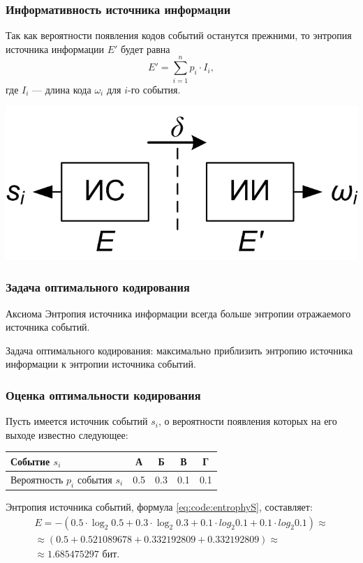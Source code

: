 \begin{frame}
    \frametitle{Информативность источника \alert{информации}}
    
    Так как вероятности появления кодов событий останутся прежними, то энтропия \alert{источника информации} $E'$ будет равна
    \begin{equation}
        \label{eq:code:entrophyI}
        E'=\sum_{i=1}^n {p_i\cdot I_i},
    \end{equation}
    где $I_i$ --- длина кода $\omega_i$ для $i$-го события.
    
    \begin{center}
        \includegraphics[width=.5\textwidth]{fig/reflection}
    \end{center}
\end{frame}

\begin{frame}
    \frametitle{Задача оптимального кодирования}
    
    \begin{block}{Аксиома}
        Энтропия источника информации всегда больше энтропии отражаемого источника событий. 
    \end{block}
    Задача оптимального кодирования: максимально приблизить энтропию источника информации к энтропии источника событий.
\end{frame}

\begin{frame}
    \frametitle{Оценка оптимальности кодирования}
    
    Пусть имеется источник событий $s_i$, о вероятности появления которых на его выходе известно следующее:
    
    \begin{center}
        \begin{tabular}{|l|c|c|c|c|}
            \hline
            Событие $s_i$                   &А      &Б      &В      &Г   \\ \hline
            Вероятность $p_i$ события $s_i$ &0.5    &0.3    &0.1    &0.1 \\ \hline
        \end{tabular}
    \end{center}
    
    Энтропия источника событий, формула \eqref{eq:code:entrophyS}, составляет:
    \[
        \begin{split}
            E=-(0.5\cdot\log_2 0.5+0.3\cdot\log_2 0.3+0.1\cdot log_2 0.1+0.1\cdot log_2 0.1)\approx \\
            \approx(0.5+0.521089678+0.332192809+0.332192809)\approx \\
            \approx 1.685475297\text{ бит}.
        \end{split}
    \]
\end{frame}

